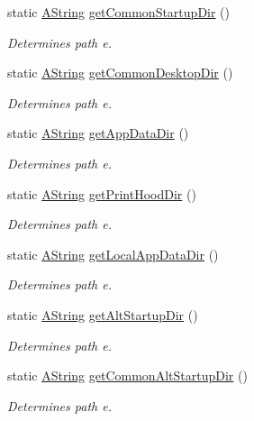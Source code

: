 \begin{DoxyCompactItemize}
static \mbox{\hyperlink{class_a_string}{A\+String}} \mbox{\hyperlink{class_dir_aebe4af5ea17098d78b367b090877ccc3}{get\+Common\+Startup\+Dir}} ()
\begin{DoxyCompactList}\small\item\em Determines path e. \end{DoxyCompactList}\item 
static \mbox{\hyperlink{class_a_string}{A\+String}} \mbox{\hyperlink{class_dir_a9536e7d442b78a5cb63e6c363f2aa73e}{get\+Common\+Desktop\+Dir}} ()
\begin{DoxyCompactList}\small\item\em Determines path e. \end{DoxyCompactList}\item 
static \mbox{\hyperlink{class_a_string}{A\+String}} \mbox{\hyperlink{class_dir_a980af97449e70906793e8ff9e22eda35}{get\+App\+Data\+Dir}} ()
\begin{DoxyCompactList}\small\item\em Determines path e. \end{DoxyCompactList}\item 
static \mbox{\hyperlink{class_a_string}{A\+String}} \mbox{\hyperlink{class_dir_a8ee1276c2733ed6de73ea0b75e2c2eae}{get\+Print\+Hood\+Dir}} ()
\begin{DoxyCompactList}\small\item\em Determines path e. \end{DoxyCompactList}\item 
static \mbox{\hyperlink{class_a_string}{A\+String}} \mbox{\hyperlink{class_dir_aad9f92fd1d7857718746c41f14e56122}{get\+Local\+App\+Data\+Dir}} ()
\begin{DoxyCompactList}\small\item\em Determines path e. \end{DoxyCompactList}\item 
static \mbox{\hyperlink{class_a_string}{A\+String}} \mbox{\hyperlink{class_dir_a276a003ff4fb51eb00d854321bd67847}{get\+Alt\+Startup\+Dir}} ()
\begin{DoxyCompactList}\small\item\em Determines path e. \end{DoxyCompactList}\item 
static \mbox{\hyperlink{class_a_string}{A\+String}} \mbox{\hyperlink{class_dir_a92838da10b3786879bc65d03dd38c180}{get\+Common\+Alt\+Startup\+Dir}} ()
\begin{DoxyCompactList}\small\item\em Determines path e. \end{DoxyCompactList}\item 

\end{DoxyCompactItemize}
